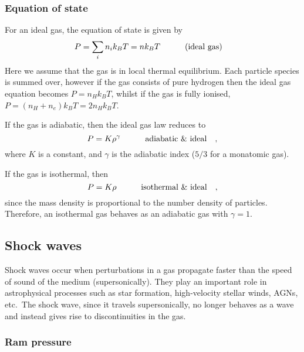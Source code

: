\subsubsection{Equation of state}
For an ideal gas, the equation of state is given by
%
\begin{equation}
	P = \sum_{i}n_i k_B T = n k_B T \qquad \qq{(ideal gas)}
	\label{eq:AP:ideal_gas}
\end{equation}
%
Here we assume that the gas is in local thermal equilibrium.
 Each particle species is summed over, however if the gas consists of pure hydrogen then the ideal gas equation becomes \(P = n_H k_B T\), whilst if the gas is fully ionised, \(P = (n_H + n_e)k_B T = 2n_H k_B T\).
\par 
If the gas is adiabatic, then the ideal gas law reduces to
%
\begin{equation}
	P = K \rho^\gamma \qquad \qq{adiabatic \& ideal},
	\label{eq:AP:adiabatic_ideal_gas}
\end{equation}
%
where \(K\) is a constant, and \(\gamma\) is the adiabatic index (\(5/3\) for a monatomic gas).
\par 
If the gas is isothermal, then
%
\begin{equation}
	P = K\rho \qquad \qq{isothermal \& ideal},
	\label{eq:AP:isothermal_ideal_gas}
\end{equation}
%
since the mass density is proportional to the number density of particles.
 Therefore, an isothermal gas behaves as an adiabatic gas with \(\gamma = 1\).
%
%
\subsection{Shock waves}
Shock waves occur when perturbations in a gas propagate faster than the speed of sound of the medium (supersonically).
 They play an important role in astrophysical processes such as star formation, high-velocity stellar winds, AGNs, etc.\
 The shock wave, since it travels supersonically, no longer behaves as a wave and instead gives rise to discontinuities in the gas.
%
\subsubsection{Ram pressure}




















